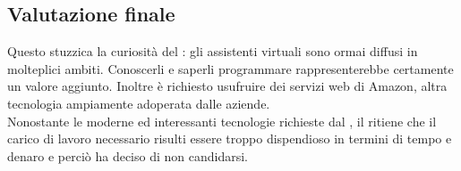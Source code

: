 \subsection {Valutazione finale}
Questo  stuzzica la curiosità del : gli assistenti virtuali sono ormai diffusi in molteplici ambiti. Conoscerli e saperli programmare rappresenterebbe certamente un valore aggiunto. Inoltre è richiesto usufruire dei servizi web di Amazon, altra tecnologia ampiamente adoperata dalle aziende. \\
Nonostante le moderne ed interessanti tecnologie richieste dal , il  ritiene che il carico di lavoro necessario risulti essere troppo dispendioso in termini di tempo e denaro e perciò ha deciso di non candidarsi.
